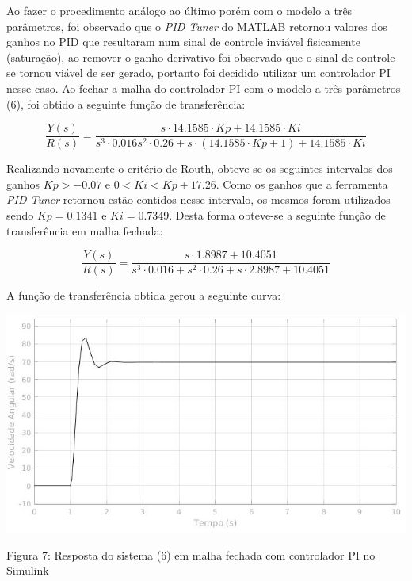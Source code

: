 \documentclass{article}
\begin{document}
    Ao fazer o procedimento análogo ao último porém com o modelo a três parâmetros, foi observado que o \textit{PID Tuner} do MATLAB retornou valores dos ganhos no PID que resultaram num sinal de controle inviável fisicamente (saturação), ao remover o ganho derivativo foi observado que o sinal de controle se tornou viável de ser gerado, portanto foi decidido utilizar um controlador PI nesse caso. Ao fechar a malha do controlador PI com o modelo a três parâmetros (6), foi obtido a seguinte função de transferência:
    
    \begin{equation}
    \frac{Y(s)}{R(s)} = \frac{s \cdot {14.1585 \cdot Kp} +  {14.1585 \cdot Ki}}{s^{3\!} \cdot {0.016} s^{2\!} \cdot {0.26} + s \cdot {(14.1585 \cdot Kp + 1)} + {14.1585 \cdot Ki}}
    \end{equation}
    
    Realizando novamente o critério de Routh, obteve-se os seguintes intervalos dos ganhos $Kp > -0.07$ e $0 < Ki < Kp + 17.26$. Como os ganhos que a ferramenta \textit{PID Tuner} retornou estão contidos nesse intervalo, os mesmos foram utilizados sendo $Kp = 0.1341$ e $Ki = 0.7349$. Desta forma obteve-se a seguinte função de transferência em malha fechada:
    
     \begin{equation}
    \frac{Y(s)}{R(s)} = \frac{s \cdot {1.8987} +  {10.4051}}{s^{3\!} \cdot {0.016} + s^{2\!} \cdot {0.26} + s \cdot {2.8987} + {10.4051}}
    \end{equation}
    
    A função de transferência obtida gerou a seguinte curva:
    
    \begin{center}
    \centering
        \includegraphics[scale=0.5]{imagens/PID3Param.jpg}
        
        \caption{Figura 7: Resposta do sistema (6) em malha fechada com controlador PI no Simulink }
    \end{center}
    
\end{document}
